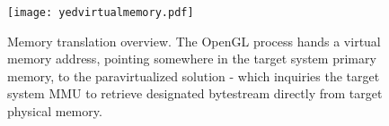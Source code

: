
\begin{figure}
\centering

\texttt{[image: yedvirtualmemory.pdf]}

\caption[Memory translation overview]{Memory translation overview. The OpenGL process hands a virtual memory address, pointing somewhere in the target system primary memory, to the paravirtualized solution - which inquiries the target system MMU to retrieve designated bytestream directly from target physical memory.} %
\label{fig:virtualmemory}

\end{figure}